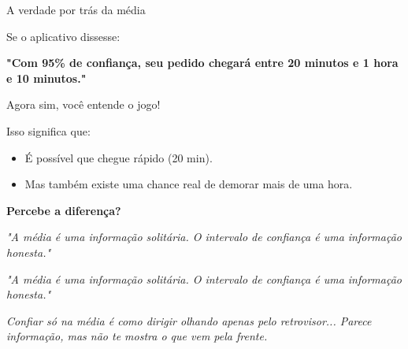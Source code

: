 \documentclass[14pt,aspectratio=1610]{beamer}
\begin{document}
\begin{frame}{A verdade por trás da média}
	\small
	\begin{block}{}
		\justifying
		
		Se o aplicativo dissesse:
		
		\begin{center}
			\textbf{"Com 95\% de confiança, seu pedido chegará entre 20 minutos e 1 hora e 10 minutos."}
		\end{center}
		
		Agora sim, você entende o jogo!
		
		Isso significa que:
		
		\begin{itemize}
			\item É possível que chegue rápido (20 min).
			\item Mas também existe uma chance real de demorar mais de uma hora.
		\end{itemize}
		
		\textbf{Percebe a diferença?}
		
		\begin{center}
			\textit{"A média é uma informação solitária. O intervalo de confiança é uma informação honesta."}
		\end{center}
		
	\end{block}
	
\end{frame}

\begin{frame}{}
	
	\begin{block}{}
		\justifying
		
		\begin{center}
			\textit{"A média é uma informação solitária. O intervalo de confiança é uma informação honesta."}
		\end{center}
		\pause
		\begin{center}
			\textit{Confiar só na média é como dirigir olhando apenas pelo retrovisor... Parece informação, mas não te mostra o que vem pela frente.}
		\end{center}
		
	\end{block}
\end{frame}	
	
\end{document}
